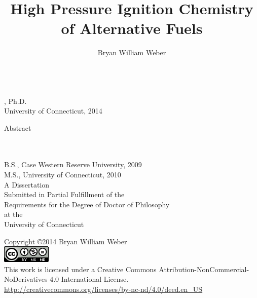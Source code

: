 \documentclass[12pt, letterpaper]{article}
\title{High Pressure Ignition Chemistry of Alternative Fuels}
\author{Bryan William Weber}
\begin{document}
\thispagestyle{empty}
\begin{center}
\thetitle \\
\theauthor, Ph.D. \\
University of Connecticut, 2014 \\
\blankline
\end{center}
Abstract

\newpage

\thispagestyle{empty}
\begin{center}
\blankline \blankline 
\thetitle \\
\blankline
\theauthor \\
\blankline \blankline
B.S., Case Western Reserve University, 2009 \\
M.S., University of Connecticut, 2010 \\
\blankline \blankline \blankline \blankline \blankline \blankline
\blankline \blankline
A Dissertation \\
Submitted in Partial Fulfillment of the \\
Requirements for the Degree of Doctor of Philosophy \\
at the \\
University of Connecticut \\
\blankline {}
\end{center}
\newpage

\thispagestyle{empty}
\begin{center}
Copyright \copyright 2014 Bryan William Weber \\
\includegraphics{images/CC-license.png} \\
\blankline
This work is licensed under a Creative Commons Attribution-NonCommercial-NoDerivatives 4.0 International License. \\
\url{http://creativecommons.org/licenses/by-nc-nd/4.0/deed.en_US} \\
\blankline \blankline \blankline \blankline \blankline \blankline
\blankline \blankline \blankline \blankline \blankline \blankline
\blankline \blankline \blankline \blankline \blankline \blankline
\blankline {}
\end{center}
\newpage
\end{document}
